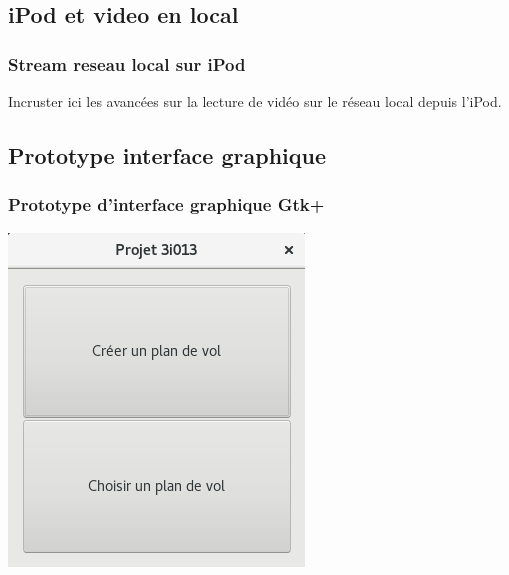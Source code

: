 \documentclass{beamer}
\begin{document}
	\begin{frame}
	\section{iPod et video en local}
		\begin{center}
		\frametitle{Stream reseau local sur iPod}
		Incruster ici les avancées sur la lecture de vidéo sur le réseau local depuis l'iPod.
		\end{center}	
	\end{frame}
	
	\begin{frame}
	\section{Prototype interface graphique}
		\begin{center}
		\frametitle{Prototype d'interface graphique Gtk+}
		\includegraphics[scale=0.60]{GUI_Gtk.png}
		\end{center}
	\end{frame}
	
\end{document}
